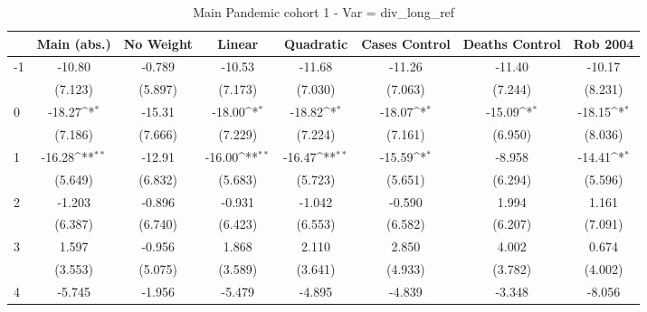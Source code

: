 \documentclass{article}
\begin{document}
{
\def\sym#1{\ifmmode^{#1}\else\(^{#1}\)\fi}
\begin{longtable}{l*{7}{c}}
\caption{Main Pandemic cohort 1 - Var = div\_long\_ref}\\
\hline\hline\endfirsthead\hline\endhead\hline\endfoot\endlastfoot
                &\multicolumn{1}{c}{Main (abs.)}&\multicolumn{1}{c}{No Weight}&\multicolumn{1}{c}{Linear}&\multicolumn{1}{c}{Quadratic}&\multicolumn{1}{c}{Cases Control}&\multicolumn{1}{c}{Deaths Control}&\multicolumn{1}{c}{Rob 2004}\\
\hline
-1              &   -10.80         &   -0.789         &   -10.53         &   -11.68         &   -11.26         &   -11.40         &   -10.17         \\
                &  (7.123)         &  (5.897)         &  (7.173)         &  (7.030)         &  (7.063)         &  (7.244)         &  (8.231)         \\
0               &   -18.27\sym{*}  &   -15.31         &   -18.00\sym{*}  &   -18.82\sym{*}  &   -18.07\sym{*}  &   -15.09\sym{*}  &   -18.15\sym{*}  \\
                &  (7.186)         &  (7.666)         &  (7.229)         &  (7.224)         &  (7.161)         &  (6.950)         &  (8.036)         \\
1               &   -16.28\sym{**} &   -12.91         &   -16.00\sym{**} &   -16.47\sym{**} &   -15.59\sym{*}  &   -8.958         &   -14.41\sym{*}  \\
                &  (5.649)         &  (6.832)         &  (5.683)         &  (5.723)         &  (5.651)         &  (6.294)         &  (5.596)         \\
2               &   -1.203         &   -0.896         &   -0.931         &   -1.042         &   -0.590         &    1.994         &    1.161         \\
                &  (6.387)         &  (6.740)         &  (6.423)         &  (6.553)         &  (6.582)         &  (6.207)         &  (7.091)         \\
3               &    1.597         &   -0.956         &    1.868         &    2.110         &    2.850         &    4.002         &    0.674         \\
                &  (3.553)         &  (5.075)         &  (3.589)         &  (3.641)         &  (4.933)         &  (3.782)         &  (4.002)         \\
4               &   -5.745         &   -1.956         &   -5.479         &   -4.895         &   -4.839         &   -3.348         &   -8.056         \\

\end{longtable}}
\end{document}
